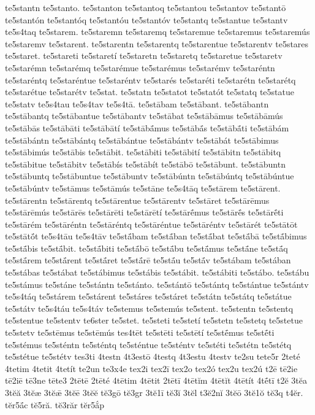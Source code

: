 {te5stantn
te5stanto.
te5stanton
te5stantoq
te5stantou
te5stantov
te5stantō
te5stantón
te5stantóq
te5stantóu
te5stantóv
te5stantq
te5stantue
te5stantv
te5s4taq
te5starem.
te5staremn
te5staremq
te5staremue
te5staremus
te5staremús
te5staremv
te5starent.
te5starentn
te5starentq
te5starentue
te5starentv
te5stares
te5staret.
te5stareti
te5staretí
te5staretn
te5staretq
te5staretue
te5staretv
te5starémn
te5starémq
te5starémue
te5starémus
te5starémv
te5staréntn
te5staréntq
te5staréntue
te5staréntv
te5starés
te5staréti
te5starétn
te5starétq
te5starétue
te5starétv
te5stat.
te5statn
te5statot
te5statót
te5statq
te5statue
te5statv
te5s4tau
te5s4tav
te5s4tā.
te5stābam
te5stābant.
te5stābantn
te5stābantq
te5stābantue
te5stābantv
te5stābat
te5stābāmus
te5stābāmús
te5stābās
te5stābāti
te5stābātí
te5stābā́mus
te5stābā́s
te5stābā́ti
te5stābám
te5stābántn
te5stābántq
te5stābántue
te5stābántv
te5stābát
te5stābimus
te5stābimús
te5stābis
te5stābit.
te5stābiti
te5stābití
te5stābitn
te5stābitq
te5stābitue
te5stābitv
te5stābís
te5stābít
te5stābō
te5stābunt.
te5stābuntn
te5stābuntq
te5stābuntue
te5stābuntv
te5stābúntn
te5stābúntq
te5stābúntue
te5stābúntv
te5stāmus
te5stāmús
te5stāne
te5s4tāq
te5stārem
te5stārent.
te5stārentn
te5stārentq
te5stārentue
te5stārentv
te5stāret
te5stārēmus
te5stārēmús
te5stārēs
te5stārēti
te5stārētí
te5stārḗmus
te5stārḗs
te5stārḗti
te5stārém
te5stāréntn
te5stāréntq
te5stāréntue
te5stāréntv
te5stārét
te5stātōt
te5stātṓt
te5s4tāu
te5s4tāv
te5stā́bam
te5stā́ban
te5stā́bat
te5stā́bā
te5stā́bimus
te5stā́bis
te5stā́bit.
te5stā́biti
te5stā́bō
te5stā́bu
te5stā́mus
te5stā́ne
te5stā́q
te5stā́rem
te5stā́rent
te5stā́ret
te5stā́rē
te5stā́u
te5stā́v
te5stábam
te5stában
te5stábas
te5stábat
te5stábimus
te5stábis
te5stábit.
te5stábiti
te5stábo.
te5stábu
te5stámus
te5stáne
te5stántn
te5stánto.
te5stántō
te5stántq
te5stántue
te5stántv
te5s4táq
te5stárem
te5stárent
te5stáres
te5stáret
te5státn
te5státq
te5státue
te5státv
te5s4táu
te5s4táv
te5stemus
te5stemús
te5stent.
te5stentn
te5stentq
te5stentue
te5stentv
te6ster
te5stet.
te5steti
te5stetí
te5stetn
te5stetq
te5stetue
te5stetv
te5stēmus
te5stēmús
tes4tēt
te5stēti
te5stētí
te5stḗmus
te5stḗti
te5stémus
te5sténtn
te5sténtq
te5sténtue
te5sténtv
te5stéti
te5stétn
te5stétq
te5stétue
te5stétv
tes3ti
4testn
4t3estō
4testq
4t3estu
4testv
te2su
tete5r
2teté
4tetim
4tetit
4tetít
te2un
te3x4e
tex2i
tex2ī
tex2o
tex2ó
tex2u
tex2ú
t2ē
tē2ie
tē2iē
tē3ne
tēte3
2tētē
2tēté
4tētim
4tētit
2tētī
4tētĭm
4tētĭt
4tētít
4tḗtī
t2ĕ
3tĕa
3tĕă
3tĕæ
3tĕǣ
3tĕē
3tĕĕ
tĕ3gō
tĕ3gr
3tĕ1ī
tĕ3ĭ
3tĕl
t3ĕ2nĭ
3tĕō
3tĕ1ŏ
tĕ3q
t4ĕr.
tĕr5ā́c
tĕ5ră.
tĕ3răr
tĕr5ắp
}
